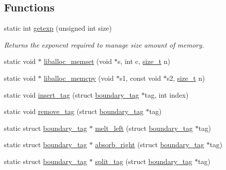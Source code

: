 \subsection*{Functions}
\begin{DoxyCompactItemize}
\item 
static int \hyperlink{a00023_ab5fc0b977bf14bdb99c8b87cae451d42_ab5fc0b977bf14bdb99c8b87cae451d42}{getexp} (unsigned int size)
\begin{DoxyCompactList}\small\item\em Returns the exponent required to manage \textquotesingle{}size\textquotesingle{} amount of memory. \end{DoxyCompactList}\item 
static void $\ast$ \hyperlink{a00023_ad824e94da51543e1febb05f96f0083ba_ad824e94da51543e1febb05f96f0083ba}{liballoc\+\_\+memset} (void $\ast$s, int c, \hyperlink{a00026_a7c94ea6f8948649f8d181ae55911eeaf_a7c94ea6f8948649f8d181ae55911eeaf}{size\+\_\+t} n)
\item 
static void $\ast$ \hyperlink{a00023_a58b3101a659b6a2f7e2ca290bef6bfb4_a58b3101a659b6a2f7e2ca290bef6bfb4}{liballoc\+\_\+memcpy} (void $\ast$s1, const void $\ast$s2, \hyperlink{a00026_a7c94ea6f8948649f8d181ae55911eeaf_a7c94ea6f8948649f8d181ae55911eeaf}{size\+\_\+t} n)
\item 
static void \hyperlink{a00023_a569f88ed08d8435e256dd225afcd26df_a569f88ed08d8435e256dd225afcd26df}{insert\+\_\+tag} (struct \hyperlink{a00095}{boundary\+\_\+tag} $\ast$tag, int index)
\item 
static void \hyperlink{a00023_aeea23ead928f2a5d40fdf7687b3c99c9_aeea23ead928f2a5d40fdf7687b3c99c9}{remove\+\_\+tag} (struct \hyperlink{a00095}{boundary\+\_\+tag} $\ast$tag)
\item 
static struct \hyperlink{a00095}{boundary\+\_\+tag} $\ast$ \hyperlink{a00023_a7ea762780416b837601691f20e085cc2_a7ea762780416b837601691f20e085cc2}{melt\+\_\+left} (struct \hyperlink{a00095}{boundary\+\_\+tag} $\ast$tag)
\item 
static struct \hyperlink{a00095}{boundary\+\_\+tag} $\ast$ \hyperlink{a00023_a9d9646746f3401f7c03ff66cba7315c8_a9d9646746f3401f7c03ff66cba7315c8}{absorb\+\_\+right} (struct \hyperlink{a00095}{boundary\+\_\+tag} $\ast$tag)
\item 
static struct \hyperlink{a00095}{boundary\+\_\+tag} $\ast$ \hyperlink{a00023_a8fd489a9d383dd6830e38fa63a0aec60_a8fd489a9d383dd6830e38fa63a0aec60}{split\+\_\+tag} (struct \hyperlink{a00095}{boundary\+\_\+tag} $\ast$tag)
\item 

\end{DoxyCompactItemize}
